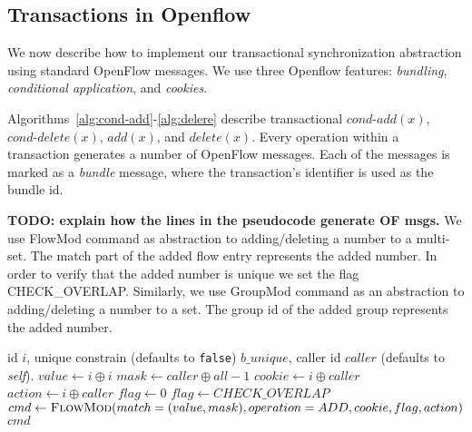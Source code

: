 \documentclass[conference]{sigcomm-alternate}
\newcommand{\concat}[0]{\oplus}
\begin{document}
\subsection{Transactions in Openflow}\label{sec:t-impl}

We now describe how to implement our transactional synchronization
abstraction using standard OpenFlow messages.
We use three Openflow features: \emph{bundling},
\emph{conditional application}, and \emph{cookies}.

Algorithms~\ref{alg:cond-add}-\ref{alg:delere} describe 
transactional  $\textit{cond-add}(x)$, $\textit{cond-delete}(x)$,
$\textit{add}(x)$, and $\textit{delete}(x)$. 
Every operation within a transaction generates a number of  OpenFlow
messages. Each of the messages is marked as a \emph{bundle} message,
where the transaction's identifier is used as the bundle id.
  
\textbf{TODO: explain how the lines in the pseudocode generate OF msgs.} 
We use FlowMod command as abstraction to adding/deleting a number to a
multi-set. The match part of the added flow entry represents the added
number. In order to verify that the added number is unique we set the
flag CHECK\_OVERLAP. Similarly, we use GroupMod command as an
abstraction to adding/deleting a number to a set. The group id of the added group represents the added number.



\begin{algorithm}[t]
    \caption{$\textit{cond-add}(x)$}
    \label{alg:multi-add}
    \begin{algorithmic}[1]
    \Require id $i$, unique constrain (defaults to \texttt{false}) $b\_unique$, caller id $caller$ (defaults to \emph{self}).
    		\State $value \gets i\concat i$
    		\State $mask \gets caller\concat all-1$
    		\State $cookie \gets i\concat caller$
    		\State $action \gets i\concat caller$
    			\State $flag \gets 0$
    		\Else
    		    \State $flag \gets CHECK\_OVERLAP$
    		\EndIf
    					\State $cmd\gets \textsc{FlowMod}(match=(value,mask), operation = ADD, cookie, flag, action) $
			\Return $cmd$
    \end{algorithmic}
\end{algorithm}
\end{document}
